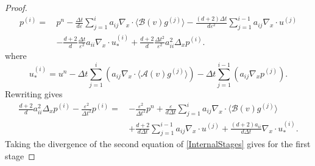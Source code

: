 \documentclass[final,11pt]{siamart251216}
\numberwithin{equation}{section}
\theoremstyle{definition}
\theoremstyle{remark}
\begin{document}
\begin{proof}
\begin{equation}
\label{eq:pressure_stage}
\begin{split}
p^{(i)} = \, & p^n - \frac{\Delta t}{d \varepsilon} \sum_{j = 1}^i a_{ij} \nabla_x \cdot \langle \mathcal{B}(v) g^{(j)} \rangle 
- \frac{(d+2)\Delta t}{d \varepsilon^2} \sum_{j = 1}^{i-1} a_{ij} \nabla_x \cdot u^{(j)} \\
& - \frac{d+2}{d} \frac{\Delta t}{\varepsilon^2} a_{ii} \nabla_x \cdot u^{(i)}_* 
+ \frac{d+2}{d} \frac{\Delta t^2}{\varepsilon^2} a_{ii}^2 \Delta_x p^{(i)}.
\end{split}
\end{equation}
where
\begin{equation}
u^{(i)}_* = u^n - \Delta t  \sum_{j = 1}^i \left( a_{ij} \nabla_x \cdot \langle \mathcal{A}(v) g^{(j)} \rangle \right) - \Delta t  \sum_{j = 1}^{i-1} \left( a_{ij} \nabla_x p^{(j)} \right).
\end{equation}
Rewriting gives
\begin{equation}
\label{InternalStagesforp}
\begin{split}
\frac{d+2}{d} a_{ii}^2 \Delta_x p^{(i)} - \frac{\varepsilon^2}{\Delta t^2 } p^{(i)} = \, & -\frac{\varepsilon^2}{\Delta t^2 } p^n + \frac{\varepsilon}{d \Delta t } \sum_{j = 1}^i a_{ij} \nabla_x \cdot \langle \mathcal{B}(v) g^{(j)} \rangle \\
& + \frac{d+2}{d \Delta t } \sum_{j = 1}^{i-1} a_{ij} \nabla_x \cdot u^{(j)} + \frac{(d+2)a_{ii}}{d \Delta t } \nabla_x \cdot u^{(i)}_*.
\end{split}
\end{equation}
Taking the divergence of the second equation of \eqref{InternalStages} gives for the first stage

\end{proof}
\end{document}
